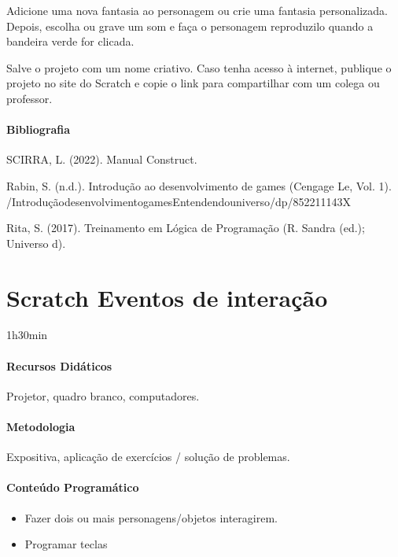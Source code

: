\documentclass[letterpaper,10pt,brazil]{sphinxmanual}
\begin{document}
\sphinxAtStartPar
{}
Adicione uma nova fantasia ao personagem ou crie uma fantasia personalizada.
Depois, escolha ou grave um som e faça o personagem reproduzi\sphinxhyphen{}lo quando a bandeira verde for clicada.

\sphinxAtStartPar
{}
Salve o projeto com um nome criativo.
Caso tenha acesso à internet, publique o projeto no site do Scratch e copie o link para compartilhar com um colega ou professor.
\subsubsection*{Bibliografia}

\sphinxAtStartPar
SCIRRA, L. (2022). Manual Construct.

\sphinxAtStartPar
Rabin, S. (n.d.). Introdução ao desenvolvimento de games (Cengage Le, Vol. 1).
/Introdução\sphinxhyphen{}desenvolvimento\sphinxhyphen{}games\sphinxhyphen{}Entendendo\sphinxhyphen{}universo/dp/852211143X

\sphinxAtStartPar
Rita, S. (2017). Treinamento em Lógica de Programação (R. Sandra (ed.); Universo d).

\sphinxstepscope


\chapter{Scratch \sphinxhyphen{} Eventos de interação}
\label{\detokenize{modelo_aula_04:scratch-eventos-de-interacao}}\label{\detokenize{modelo_aula_04::doc}}
\sphinxAtStartPar
{} 1h30min
\subsubsection*{Recursos Didáticos}

\sphinxAtStartPar
Projetor, quadro branco, computadores.
\subsubsection*{Metodologia}

\sphinxAtStartPar
Expositiva, aplicação de exercícios / solução de problemas.
\subsubsection*{Conteúdo Programático}
\begin{itemize}
\item {} 
\sphinxAtStartPar
Fazer dois ou mais personagens/objetos interagirem.

\item {} 
\sphinxAtStartPar
Programar teclas

\end{itemize}
\end{document}
